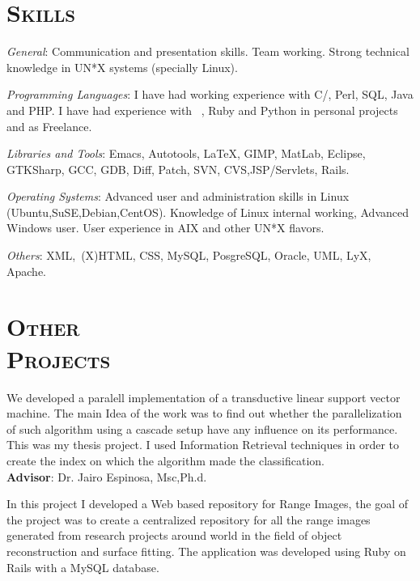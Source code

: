 \begin{resume}
\section{\textsc{Skills}}

\emph{General}: Communication and presentation skills. Team
working. Strong technical knowledge in UN*X systems (specially Linux).

\emph{Programming Languages}: I have had working experience with
 C/\Cplusplus, Perl, SQL, Java and PHP. I have had experience with \
 \CSharp, Ruby and Python in personal projects and as Freelance.

\emph{Libraries and Tools}: Emacs, Autotools, \LaTeX, GIMP, MatLab, Eclipse, GTKSharp, GCC, GDB, Diff, Patch, SVN, CVS,JSP/Servlets, Rails.

\emph{Operating Systems}: Advanced user and administration skills in
Linux (Ubuntu,SuSE,Debian,CentOS). Knowledge of Linux internal
working, Advanced Windows user. User experience in  AIX and  other UN*X flavors.

\emph{Others}: XML,\ (X)HTML, CSS, MySQL, PosgreSQL, Oracle, UML, LyX, Apache.


\section{\textsc{Other\\  Projects}}

\dates{July 2007 - December 2007}
\begin{position}
We developed a paralell implementation of a transductive
linear support vector machine. The main Idea of the work was
to find out whether the parallelization of such algorithm using a cascade
setup have any influence on its performance. This was my thesis
project. I used Information Retrieval techniques in order to create
the index on which the algorithm made the classification.
\\
\textbf{Advisor}:  Dr. Jairo Espinosa, Msc,Ph.d.
\end{position}

\begin{position}
 In this project I developed a Web based repository for Range Images, the goal of the
 project was to create a centralized repository for all the range
 images generated from research projects around world in the field of
 object reconstruction and surface fitting. The application was
 developed using Ruby on Rails with a MySQL database.
\end{position}


\end{resume}
